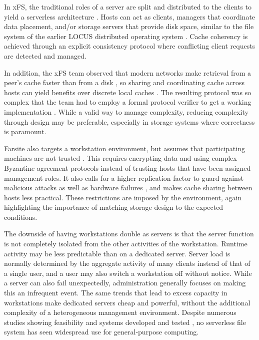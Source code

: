 In xFS, the traditional roles of a server are split and distributed to the clients to yield a serverless architecture \cite{anderson95b}. Hosts can act as clients, managers that coordinate data placement, and/or storage servers that provide disk space, similar to the file system of the earlier LOCUS distributed operating system \cite{walker}. Cache coherency is achieved through an explicit consistency protocol where conflicting client requests are detected and managed.

In addition, the xFS team observed that modern networks make retrieval from a peer's cache faster than from a disk \cite{dahlin94b}, so sharing and coordinating cache across hosts can yield benefits over discrete local caches \cite{dahlin94a}. The resulting protocol was so complex that the team had to employ a formal protocol verifier to get a working implementation \cite{wang98}. While a valid way to manage complexity, reducing complexity through design may be preferable, especially in storage systems where correctness is paramount.

Farsite also targets a workstation environment, but assumes that participating machines are not trusted \cite{adya}. This requires encrypting data and using complex Byzantine agreement protocols instead of trusting hosts that have been assigned management roles. It also calls for a higher replication factor to guard against malicious attacks as well as hardware failures \cite{dahlin94a}, and makes cache sharing between hosts less practical. These restrictions are imposed by the environment, again highlighting the importance of matching storage design to the expected conditions.

The downside of having workstations double as servers is that the server function is not completely isolated from the other activities of the workstation. Runtime activity may be less predictable than on a dedicated server. Server load is normally determined by the aggregate activity of many clients instead of that of a single user, and a user may also switch a workstation off without notice. While a server can also fail unexpectedly, administration generally focuses on making this an infrequent event. The same trends that lead to excess capacity in workstations make dedicated servers cheap and powerful, without the additional complexity of a heterogeneous management environment. Despite numerous studies \cite{bolosky,douceur99,douceur01} showing feasibility and systems developed and tested \cite{adya,walker}, no serverless file system has seen widespread use for general-purpose computing.

